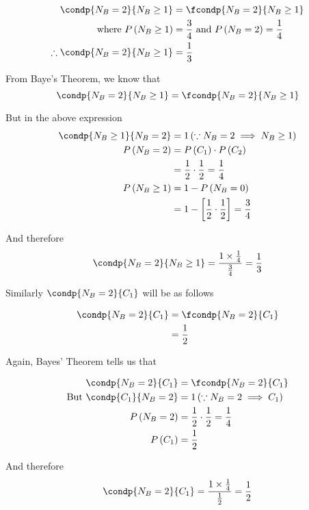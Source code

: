 \documentclass[14pt,fleqn]{extarticle}
\begin{document}
\newcard 
\begin{align}
	\condp{N_B=2}{N_B\geq 1} &= \fcondp{N_B=2}{N_B\geq 1}\\
	\text{where } P \left(N_B\geq 1 \right) &= \frac{3}{4} \text{ and } P \left(N_B = 2 \right) = \frac{1}{4} \\
	\therefore \condp{N_B=2}{N_B\geq 1} &= \frac{1}{3} 
\end{align}

\newcard 

From Baye's Theorem, we know that 
\[ \condp{N_B=2}{N_B\geq 1} = \fcondp{N_B=2}{N_B\geq 1}\]

But in the above expression 
\begin{align}
	\condp{N_B\geq 1}{N_B = 2} &= 1 \left( \because N_B = 2\implies N_B \geq 1\right) \\
	P \left(N_B =2 \right) & = P \left(C_1 \right)\cdot P \left(C_2 \right) \\
	&= \frac{1}{2}\cdot\frac{1}{2} = \frac{1}{4} \\ 
	P \left(N_B\geq 1 \right) &= 1- P \left(N_B = 0 \right) \\
	&= 1- \left[\frac{1}{2}\cdot\frac{1}{2} \right] = \frac{3}{4} 
\end{align}

And therefore 
\[ \condp{N_B=2}{N_B \geq 1 } = \frac{1\times\frac{1}{4}}{\frac{3}{4}} = \frac{1}{3} \] 

\newcard 

Similarly $\condp{N_B=2}{C_1}$ will be as follows 

\begin{align}
\condp{N_B=2}{C_1} &= \fcondp{N_B=2}{C_1}  \\ 
&= \frac{1}{2} 
\end{align}

\newcard 

Again, Bayes' Theorem tells us that 

\begin{align}
	\condp{N_B=2}{C_1} &= \fcondp{N_B=2}{C_1}  \\
	\text{But } \condp{C_1}{N_B=2} &= 1 \left(\because N_B=2 \implies C_1 \right) \\
	P \left(N_B=2 \right) &= \frac{1}{2}\cdot\frac{1}{2} = \frac{1}{4} \\
	P \left(C_1 \right) &= \frac{1}{2}
\end{align}

And therefore 
\[ \condp{N_B=2}{C_1} = \dfrac{1\times\frac{1}{4}}{\frac{1}{2}} = \frac{1}{2} \]
\end{document}
